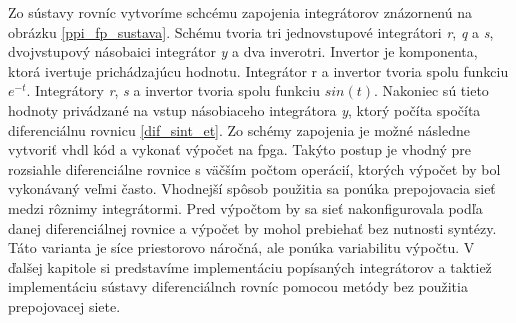 Zo sústavy rovníc vytvoríme schcému zapojenia integrátorov znázornenú na obrázku \ref{ppi_fp_sustava}. Schému tvoria tri jednovstupové integrátori \textit{r}, \textit{q} a \textit{s}, dvojvstupový násobaici integrátor \textit{y} a dva inverotri. Invertor je komponenta, ktorá ivertuje prichádzajúcu hodnotu. Integrátor r a invertor tvoria spolu funkciu $ e^{-t} $. Integrátory \textit{r}, \textit{s} a invertor tvoria spolu funkciu $ sin(t) $. Nakoniec sú tieto hodnoty privádzané na vstup násobiaceho integrátora \textit{y}, ktorý počíta spočíta diferenciálnu rovnicu \ref{dif_sint_et}.
Zo schémy zapojenia je možné následne vytvoriť vhdl kód a vykonať výpočet na fpga. Takýto postup je vhodný pre rozsiahle diferenciálne rovnice s väčším počtom operácií, ktorých výpočet by bol vykonávaný veľmi často. Vhodnejší spôsob použitia sa ponúka prepojovacia sieť medzi rôznimy integrátormi. Pred výpočtom by sa sieť nakonfigurovala podľa danej diferenciálnej rovnice a výpočet by mohol prebiehať bez nutnosti syntézy. Táto varianta je síce priestorovo náročná, ale ponúka variabilitu výpočtu. V ďalšej kapitole si predstavíme implementáciu popísaných integrátorov a taktiež implementáciu sústavy diferenciálnch rovníc pomocou metódy bez použitia prepojovacej siete.
\bigskip

